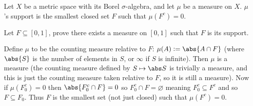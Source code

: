 \bexerc

    Let $X$ be a metric space with its Borel $\sigma$-algebra, and let $\mu$ be a measure on $X$.
    $\mu$'s {\emphcolor support} is the smallest closed set $F$ such that $\mu(F^c)=0$.

    Let $F\subseteq[0,1]$, prove there exists a measure on $[0,1]$ such that $F$ is its support.

\eexerc

Define $\mu$ to be the counting measure relative to $F$: $\mu(A)\coloneqq\abs{A\cap F}$ (where $\abs{S}$ is the number of elements in $S$, or $\infty$ if $S$ is infinite).
Then $\mu$ is a measure (the counting measure defined by $S\mapsto\abs S$ is trivially a measure, and this is just the counting measure taken relative to $F$, so it is still a measure).
Now if $\mu(F_0^c)=0$ then $\abs{F_0^c\cap F}=0$ so $F_0^c\cap F=\varnothing$ meaning $F_0^c\subseteq F^c$ and so $F\subseteq F_0$.
Thus $F$ is the smallest set (not just closed) such that $\mu(F^c)=0$.

\bye

